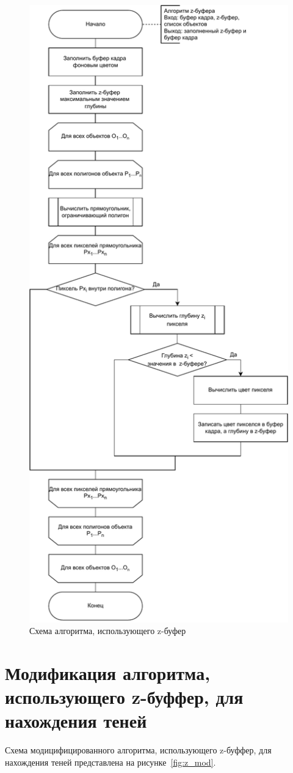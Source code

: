 \begin{figure}[h!]
	\centering
	\includegraphics[width=0.65\linewidth]{img/z}
	\caption{Схема алгоритма, использующего z-буфер}
	\label{fig:z}
\end{figure}
\clearpage

\section[Модификация алгоритма, использующего z-буффер, для нахождения теней]{Модификация алгоритма,\\использующего z-буффер, для\\нахождения теней}

Схема модицифицированного алгоритма, использующего z-буффер, для нахождения теней представлена на рисунке~\ref{fig:z_mod}.

